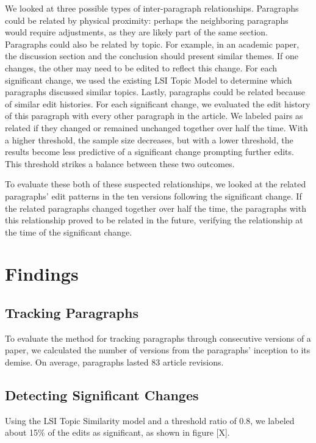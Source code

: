 We looked at three possible types of inter-paragraph relationships.
Paragraphs could be related by physical proximity: perhaps the
neighboring paragraphs would require adjustments, as they are likely
part of the same section. Paragraphs could also be related by topic. For
example, in an academic paper, the discussion section and the conclusion
should present similar themes. If one changes, the other may need to be
edited to reflect this change. For each significant change, we used the
existing LSI Topic Model to determine which paragraphs discussed similar
topics. Lastly, paragraphs could be related because of similar edit
histories. For each significant change, we evaluated the edit history of
this paragraph with every other paragraph in the article. We labeled
pairs as related if they changed or remained unchanged together over
half the time. With a higher threshold, the sample size decreases, but
with a lower threshold, the results become less predictive of a
significant change prompting further edits. This threshold strikes a
balance between these two outcomes.

To evaluate these both of these suspected relationships, we looked at
the related paragraphs' edit patterns in the ten versions following the
significant change. If the related paragraphs changed together over half
the time, the paragraphs with this relationship proved to be related in
the future, verifying the relationship at the time of the significant
change.

\section{Findings}\label{findings}

\subsection{Tracking Paragraphs}\label{tracking-paragraphs-1}

To evaluate the method for tracking paragraphs through consecutive
versions of a paper, we calculated the number of versions from the
paragraphs' inception to its demise. On average, paragraphs lasted 83
article revisions.

\subsection{Detecting Significant
Changes}\label{detecting-significant-changes}

Using the LSI Topic Similarity model and a threshold ratio of 0.8, we
labeled about 15\% of the edits as significant, as shown in figure
{[}X{]}.

